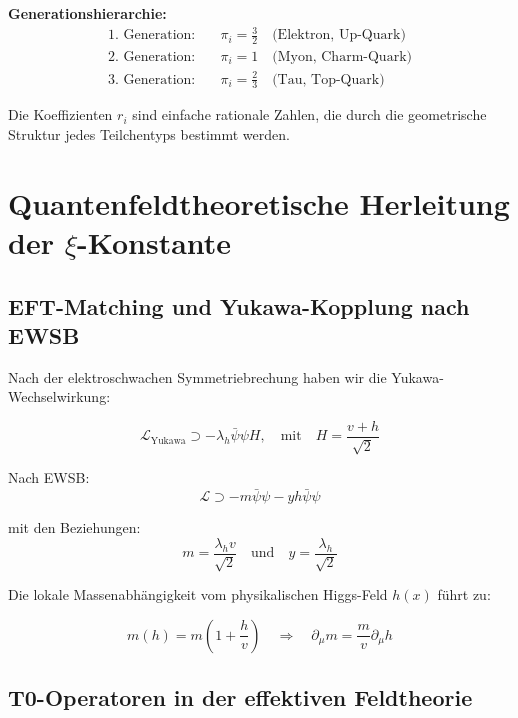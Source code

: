 \textbf{Generationshierarchie:}
\begin{align}
	\text{1. Generation:} \quad &\pi_i = \frac{3}{2} \quad \text{(Elektron, Up-Quark)} \\
	\text{2. Generation:} \quad &\pi_i = 1 \quad \text{(Myon, Charm-Quark)} \\
	\text{3. Generation:} \quad &\pi_i = \frac{2}{3} \quad \text{(Tau, Top-Quark)}
\end{align}

Die Koeffizienten $r_i$ sind einfache rationale Zahlen, die durch die geometrische Struktur jedes Teilchentyps bestimmt werden.

\section{Quantenfeldtheoretische Herleitung der $\xi$-Konstante}
\label{sec:qft_derivation}

\subsection{EFT-Matching und Yukawa-Kopplung nach EWSB}
\label{subsec:eft_matching}

Nach der elektroschwachen Symmetriebrechung haben wir die Yukawa-Wechselwirkung:

\begin{equation}
	\mathcal{L}_{\text{Yukawa}} \supset -\lambda_h \bar{\psi}\psi H, \quad \text{mit} \quad H = \frac{v + h}{\sqrt{2}}
\end{equation}

Nach EWSB:
\begin{equation}
	\mathcal{L} \supset -m \bar{\psi}\psi - y h \bar{\psi}\psi
\end{equation}

mit den Beziehungen:
\begin{equation}
	m = \frac{\lambda_h v}{\sqrt{2}} \quad \text{und} \quad y = \frac{\lambda_h}{\sqrt{2}}
\end{equation}

Die lokale Massenabhängigkeit vom physikalischen Higgs-Feld $h(x)$ führt zu:

\begin{equation}
	m(h) = m\left(1 + \frac{h}{v}\right) \quad \Rightarrow \quad \partial_\mu m = \frac{m}{v}\partial_\mu h
\end{equation}

\subsection{T0-Operatoren in der effektiven Feldtheorie}
\label{subsec:t0_operators}

